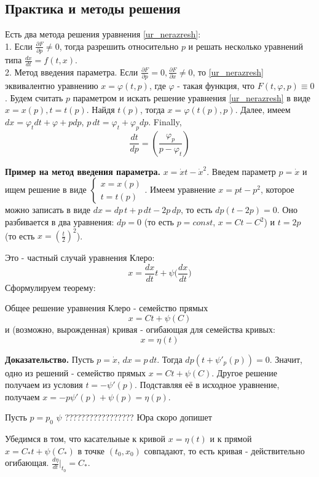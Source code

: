 \subsection{Практика и методы решения}
Есть два метода решения уравнения \ref{ur_nerazresh}:\\
1. Если  $\frac{\partial F}{\partial p}\ne 0$, тогда разрешить относительно
$p$ и решать несколько уравнений типа  $\frac{dx}{dt}=f(t,x)$.\\
2. Метод введения параметра.
Если $\frac{\partial F}{\partial p}=0,\frac{\partial F}{\partial x}\ne 0$,
то \ref{ur_nerazresh} эквивалентно уравнению $x=\varphi(t,p)$, 
где $\varphi$ - такая функция, что $F(t,\varphi,p)\equiv 0$. 
Будем считать $p$ параметром и искать решение уравнения \ref{ur_nerazresh}
в виде $x=x(p),t=t(p)$. Найдя  $t(p)$, тогда  $x=\varphi(t(p),p)$.
Далее, имеем $dx=\varphi_t dt+\varphi+p dp$,
$p\,dt=\varphi_t+\varphi_p dp$. Finally,
$$\frac{dt}{dp}=\left( \frac{\varphi_p}{p-\varphi_t} \right)$$


\textbf{Пример на метод введения параметра.} 
$x=\dot xt-\dot x^2$. Введем параметр $p=\dot x$ и ищем решение в виде
$\begin{cases}x=x(p)\\t=t(p)\end{cases}$.
Имеем уравнение $x=pt-p^2$, которое можно записать в виде
$dx=dp\,t+p\,dt-2p\,dp$, то есть $dp(t-2p)=0$. Оно разбивается в два
уравнения:  $dp=0$ (то есть $p=const$,  $x=Ct-C^2$) и  $t=2p$ (то есть
$x=\left( \frac{t}{2} \right)^2$). 

Это - частный случай уравнения Клеро:
$$x=\frac{dx}{dt}t+\psi\Big(\frac{dx}{dt}\Big)$$
Сформулируем теорему:
\begin{theor}
Общее решение уравнения Клеро - семейство прямых
$$x=Ct+\psi(C)$$ 
и (возможно, вырожденная) кривая - огибающая для семейства кривых:
$$x=\eta(t)$$
\end{theor}
\textbf{Доказательство.} Пусть $p=\dot x$,  $dx=p\,dt$. Тогда
$dp(t+\psi'_p(p))=0$. Значит, одно из решений - семейство прямых
 $x=Ct+\psi(C)$. Другое решение получаем из условия 
 $t=-\psi'(p)$. Подставляя её в исходное уравнение, получаем 
 $x=-p\psi'(p)+\psi(p)=\eta(p)$.

 Пусть $p=p_0$
 $\psi$ ????????????????? Юра скоро допишет

Убедимся в том, что касательные к кривой $x=\eta(t)$ и к прямой  $x=C_*t+
\psi(C_*)$ в точке  $(t_0,x_0)$ совпадают, то есть кривая - действительно 
огибающая. 
$\frac{d\eta}{dt}\big|_{t_0}=C_*$. 

